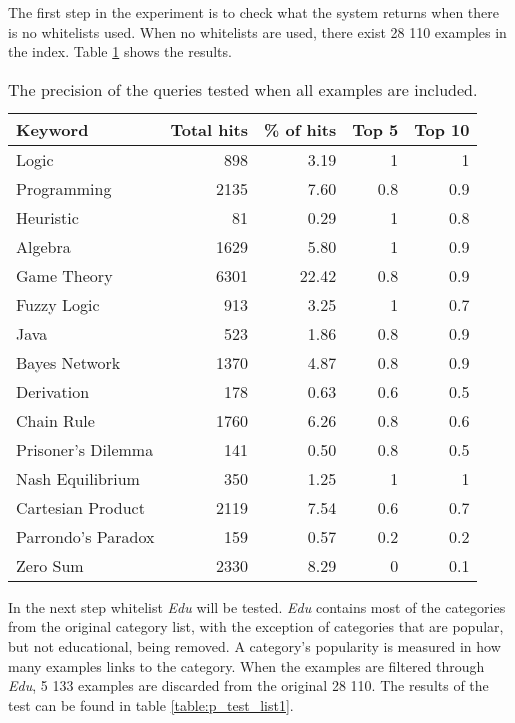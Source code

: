 The first step in the experiment is to check what the system returns when there is no whitelists used. When no whitelists are used, there exist 28 110 examples in the index. Table \ref{table:p_test_no-list} shows the results.

\begin{table}[h]
\centering
\small
\begin{tabular} {|| p{10em} | r | r | r | r ||} 
 \hline
 Keyword & Total hits & \% of hits & Top 5 & Top 10 \\ [0.5ex] 
 \hline

Logic & 898 & 3.19 & 1 & 1 \\
Programming & 2135 & 7.60 & 0.8 & 0.9 \\
Heuristic & 81 & 0.29 & 1 & 0.8 \\
Algebra & 1629 & 5.80 & 1 & 0.9 \\
Game Theory & 6301 & 22.42 & 0.8 & 0.9 \\
\hline
Fuzzy Logic & 913 & 3.25 & 1 & 0.7 \\
Java & 523 & 1.86 & 0.8 & 0.9 \\
Bayes Network & 1370 & 4.87 & 0.8 & 0.9 \\
Derivation & 178 & 0.63 & 0.6 & 0.5 \\
\hline
Chain Rule & 1760 & 6.26 & 0.8 & 0.6 \\
Prisoner's Dilemma & 141 & 0.50 & 0.8 & 0.5 \\
Nash Equilibrium & 350 & 1.25 & 1 & 1 \\
Cartesian Product & 2119 & 7.54 & 0.6 & 0.7 \\
Parrondo's Paradox & 159 & 0.57 &  0.2 & 0.2 \\
Zero Sum & 2330 & 8.29 & 0 & 0.1 \\

 \hline
\end{tabular}
\caption{The precision of the queries tested when all examples are included.}
\label{table:p_test_no-list}
\end{table}
\clearpage

In the next step whitelist \textit{Edu} will be tested. \textit{Edu} contains most of the categories from the original category list, with the exception of categories that are popular, but not educational, being removed. A category's popularity is measured in how many examples links to the category. When the examples are filtered through \textit{Edu}, 5 133 examples are discarded from the original 28 110. The results of the test can be found in table \ref{table:p_test_list1}.

